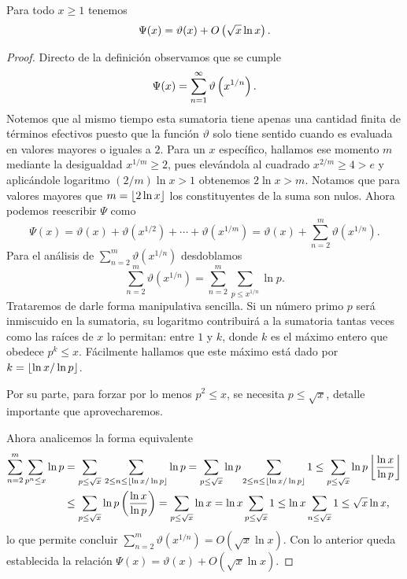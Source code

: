 \begin{lemma}
  \label{lem:psi-is-theta-osqrtxlnx}
  Para todo \(x \geq 1\) tenemos
  \[
    \Psi(x) = \vartheta(x) + O\left( \sqrt{x}\ln x \right).
  \]
\end{lemma}

\begin{proof}
  Directo de la definici\'on observamos que se cumple 
  \[
    \Psi(x) = \sum_{n = 1}^\infty \vartheta\left( x^{1/n} \right).
  \]
  Notemos que al mismo tiempo esta sumatoria tiene apenas
  una cantidad finita de t\'erminos efectivos puesto que la funci\'on \(\vartheta\)
  solo tiene sentido cuando es evaluada en valores mayores o iguales a \(2\).
  Para un \(x\) espec\'ifico, hallamos ese momento \(m\) mediante la desigualdad
  \(x^{1/m} \geq 2\),
  pues elev\'andola al cuadrado
  \(x^{2/m} \geq 4 > e\)
  y aplic\'andole logaritmo
  \((2/m)\ln x > 1\)
  obtenemos
  \(2 \ln x > m\).
  Notamos que para valores mayores que
  \(m = \left\lfloor 2 \ln x \right\rfloor\) los constituyentes de la suma son nulos.
  Ahora podemos reescribir \(\Psi\) como 
  \[
    \Psi(x) = \vartheta(x) + \vartheta(x^{1/2}) + \cdots + \vartheta(x^{1/m})
    = \vartheta(x) + \sum_{n = 2}^m \vartheta(x^{1/n}).
  \]
  Para el an\'alisis de \(\sum_{n = 2}^m \vartheta(x^{1/n})\) desdoblamos
  \[
    \sum_{n = 2}^m \vartheta(x^{1/n})
    = \sum_{n = 2}^m \sum_{p \leq x^{1/n}} \ln p.
  \]
  Trataremos de darle forma manipulativa sencilla.
  Si un n\'umero primo \(p\) ser\'a inmiscuido en la sumatoria,
  su logaritmo contribuir\'a a la sumatoria tantas veces como las ra\'ices de \(x\) lo permitan:
  entre \(1\) y \(k\), donde \(k\) es el m\'aximo entero que obedece \(p^k \le x\).
  F\'acilmente hallamos que este m\'aximo est\'a dado por \(k = \left\lfloor \ln x / \ln p \right\rfloor\).
  
  Por su parte, para forzar por lo menos \(p^2 \le x\),
  se necesita \(p \le \sqrt{x}\), detalle importante que aprovecharemos.
  
  Ahora analicemos la forma equivalente
  \begin{align*}
    \sum_{n = 2}^m \sum_{p^n \leq x} \ln p
    &= \sum_{p \leq \sqrt{x}} \, \sum_{2 \leq n \leq \left\lfloor \ln x / \ln p \right\rfloor} \ln p
    = \sum_{p \leq \sqrt{x}} \ln p \sum_{2 \leq n \leq \left\lfloor \ln x / \ln p \right\rfloor} 1
    \leq \sum_{p \leq \sqrt{x}} \ln p \left\lfloor \frac{\ln x}{\ln p} \right\rfloor \\
    &\leq \sum_{p \leq \sqrt{x}} \ln p \left( \frac{\ln x}{\ln p} \right)
    = \sum_{p \leq \sqrt{x}} \ln x
    = \ln x \sum_{p \leq \sqrt{x}} 1
    \leq \ln x \sum_{n \leq \sqrt{x}} 1
    \leq \sqrt{x} \ln x,
  \end{align*}
  lo que permite concluir \(\sum_{n = 2}^m \vartheta(x^{1/n}) = O(\sqrt{x} \ln x)\).
  Con lo anterior queda establecida la relaci\'on \(\Psi(x) = \vartheta(x) + O(\sqrt{x} \ln x)\).
\end{proof}

